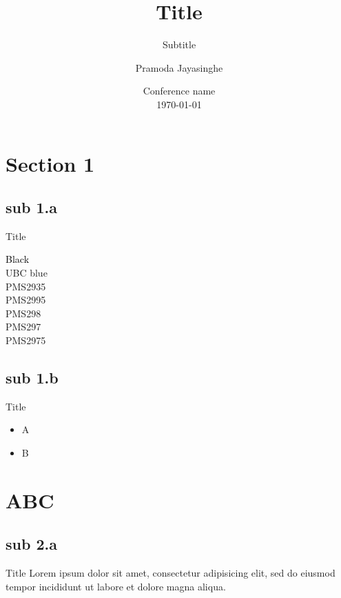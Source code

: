 \documentclass[aspectratio=43]{beamer}
\title{Title}
\subtitle{Subtitle}
\author[P. S. Jayasinghe]{Pramoda Jayasinghe}
\institute[SPPH]{School of Population and Public Health}
\date[Conference]{Conference name\\\today}
\begin{document}
	
	\begin{frame}[plain]
		\titlepage
	\end{frame}
	
	\section{Section 1}
	\subsection{sub 1.a}
	
	\begin{frame}{Title}
		
		\textcolor{black}{Black}\\
		\textcolor{UBCBlue}{UBC blue}\\
		\textcolor{PMS2935}{PMS2935}\\
		\textcolor{PMS2995}{PMS2995}\\
		\textcolor{PMS298}{PMS298}\\
		\textcolor{PMS297}{PMS297}\\
		\textcolor{PMS2975}{PMS2975}
		
	\end{frame}
	
	\subsection{sub 1.b}
	
	\begin{frame}{Title}
		\begin{itemize}
			\item A
			\item B
		\end{itemize}
	\end{frame}
	
	\section{ABC}
	
	\begin{frame}[plain]
		\sectionpage 
	\end{frame}
	
	\subsection{sub 2.a}
	
	\begin{frame}{Title}		
		Lorem ipsum dolor sit amet, consectetur adipisicing elit, sed do eiusmod tempor incididunt ut labore et dolore magna aliqua.
	\end{frame}
	
\end{document}
